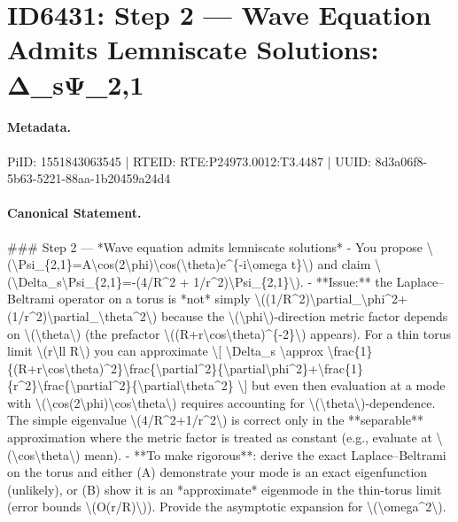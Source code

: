 \section*{ID6431: Step 2 — Wave Equation Admits Lemniscate Solutions: Δ\_sΨ\_2,1}
\paragraph{Metadata.}
PiID: 1551843063545 | RTEID: RTE:P24973.0012:T3.4487 | UUID: 8d3a06f8-5b63-5221-88aa-1b20459a24d4

\paragraph{Canonical Statement.}
\#\#\# Step 2 — *Wave equation admits lemniscate solutions* - You propose \textbackslash{}(\textbackslash{}Psi\_\{2,1\}=A\textbackslash{}cos(2\textbackslash{}phi)\textbackslash{}cos(\textbackslash{}theta)e\textasciicircum{}\{-i\textbackslash{}omega t\}\textbackslash{}) and claim \textbackslash{}(\textbackslash{}Delta\_s\textbackslash{}Psi\_\{2,1\}=-(4/R\textasciicircum{}2 + 1/r\textasciicircum{}2)\textbackslash{}Psi\_\{2,1\}\textbackslash{}). - **Issue:** the Laplace–Beltrami operator on a torus is *not* simply \textbackslash{}((1/R\textasciicircum{}2)\textbackslash{}partial\_\textbackslash{}phi\textasciicircum{}2+(1/r\textasciicircum{}2)\textbackslash{}partial\_\textbackslash{}theta\textasciicircum{}2\textbackslash{}) because the \textbackslash{}(\textbackslash{}phi\textbackslash{})-direction metric factor depends on \textbackslash{}(\textbackslash{}theta\textbackslash{}) (the prefactor \textbackslash{}((R+r\textbackslash{}cos\textbackslash{}theta)\textasciicircum{}\{-2\}\textbackslash{}) appears). For a thin torus limit \textbackslash{}(r\textbackslash{}ll R\textbackslash{}) you can approximate \textbackslash{}[ \textbackslash{}Delta\_s \textbackslash{}approx \textbackslash{}frac\{1\}\{(R+r\textbackslash{}cos\textbackslash{}theta)\textasciicircum{}2\}\textbackslash{}frac\{\textbackslash{}partial\textasciicircum{}2\}\{\textbackslash{}partial\textbackslash{}phi\textasciicircum{}2\}+\textbackslash{}frac\{1\}\{r\textasciicircum{}2\}\textbackslash{}frac\{\textbackslash{}partial\textasciicircum{}2\}\{\textbackslash{}partial\textbackslash{}theta\textasciicircum{}2\} \textbackslash{}] but even then evaluation at a mode with \textbackslash{}(\textbackslash{}cos(2\textbackslash{}phi)\textbackslash{}cos\textbackslash{}theta\textbackslash{}) requires accounting for \textbackslash{}(\textbackslash{}theta\textbackslash{})-dependence. The simple eigenvalue \textbackslash{}(4/R\textasciicircum{}2+1/r\textasciicircum{}2\textbackslash{}) is correct only in the **separable** approximation where the metric factor is treated as constant (e.g., evaluate at \textbackslash{}(\textbackslash{}cos\textbackslash{}theta\textbackslash{}) mean). - **To make rigorous**: derive the exact Laplace–Beltrami on the torus and either (A) demonstrate your mode is an exact eigenfunction (unlikely), or (B) show it is an *approximate* eigenmode in the thin-torus limit (error bounds \textbackslash{}(O(r/R)\textbackslash{})). Provide the asymptotic expansion for \textbackslash{}(\textbackslash{}omega\textasciicircum{}2\textbackslash{}). 